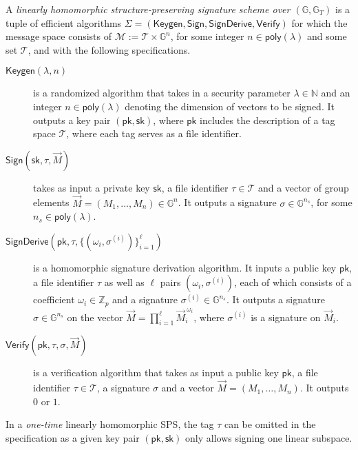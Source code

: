 \documentclass[10pt]{llncs}
\newcommand{\G}{\mathbb{G}}
\newcommand{\Z}{\mathbb{Z}}
\newcommand{\sk}{\mathsf{sk}}
\newcommand{\pk}{\mathsf{pk}}
\begin{document}
\begin{definition}\label{hncs-def}  
  A \emph{linearly homomorphic structure-preserving signature scheme
    over $(\G,\G_T)$} is a tuple of efficient algorithms
  $\Sigma=(\mathsf{Keygen},\mathsf{Sign},\mathsf{SignDerive},\mathsf{Verify})$
  for which the message space consists of $\mathcal{M} := \mathcal{T}
  \times \G^n$, for some integer $n \in \mathsf{poly}(\lambda)$ and
  some set $\mathcal{T}$, and with the following specifications.
  \begin{description}  
  \item[\boldmath$\mathsf{Keygen}(\lambda,n)$] is a randomized  
    algorithm that takes in a security parameter $\lambda \in  
    \mathbb{N}$ and an integer $n \in \mathsf{poly}(\lambda)$ denoting  
    the dimension of vectors to be signed. It outputs a key pair  
    $(\pk,\sk)$, where $\pk$ includes  the description of a tag   
    space $\mathcal{T}$, where each tag serves as a file identifier.   
  \item[\boldmath$\mathsf{Sign}(\mathsf{sk},\tau,\vec{M} )$] takes as
    input a private key $\sk$, a file identifier $\tau \in
    \mathcal{T}$ and a vector of group elements
    $\vec{M}=(M_1,\dotsc,M_n) \in \G^n$. It outputs a signature
    $\sigma \in \G^{n_{s}}$, for some $n_s \in
    \mathsf{poly}(\lambda)$.
  \item[\boldmath$\mathsf{SignDerive}(\mathsf{pk},\tau,\{(\omega_i,
    \sigma^{(i)})\}_{i=1}^\ell )$] is a homomorphic signature 
    derivation algorithm.  It inputs a public key $\mathsf{pk}$, a
    file identifier $\tau$ as well as $\ell$ pairs
    $(\omega_i,\sigma^{(i)}) $, each of which consists of a
    coefficient $\omega_i \in \Z_p$ and a signature $\sigma^{(i)} \in
    \G^{n_{s}}$. It outputs a signature $\sigma \in \G^{n_{s}}$ on the
    vector $\vec{M}=\prod_{i=1}^{\ell} \vec{M}_i^{~ \omega_i }$, where
    $\sigma^{(i)}$ is a signature on $\vec{M}_i$.
  \item[\boldmath$\mathsf{Verify}(\mathsf{pk},\tau,\sigma,\vec{M})$]
    is a  verification algorithm that takes as input a
    public key $\pk$, a file identifier $\tau \in \mathcal{T}$, a
    signature $\sigma$ and a vector $\vec{M}=(M_1,\dotsc,M_n)$. It
    outputs $0$ or $1$. 
  \end{description}  
\end{definition}  
  
In a \emph{one-time} linearly homomorphic SPS, the tag $\tau$ can be
omitted in the specification as a given key pair $(\pk,\sk)$ only
allows signing one linear subspace.
\end{document}

